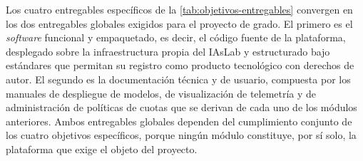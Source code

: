 Los cuatro entregables específicos de la \cref{tab:objetivos-entregables} convergen en los dos entregables globales exigidos para el proyecto de grado. El primero es el \emph{software} funcional y empaquetado, es decir, el código fuente de la plataforma, desplegado sobre la infraestructura propia del IAsLab y estructurado bajo estándares que permitan su registro como producto tecnológico con derechos de autor. El segundo es la documentación técnica y de usuario, compuesta por los manuales de despliegue de modelos, de visualización de telemetría y de administración de políticas de cuotas que se derivan de cada uno de los módulos anteriores. Ambos entregables globales dependen del cumplimiento conjunto de los cuatro objetivos específicos, porque ningún módulo constituye, por sí solo, la plataforma que exige el objeto del proyecto.
